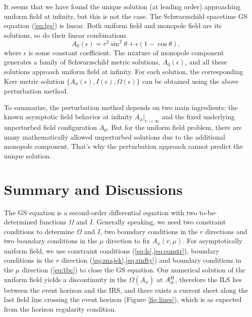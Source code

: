 \documentclass[iop,apj]{emulateapj}
\def\ct{\cos\theta}
\def\sst{\sin^2\theta}
\def\be{\begin{equation}}
\def\ee{\end{equation}}
\def\AB{A_\phi^{\rm H}}
\begin{document}
It seems that we have found the unique solution (at leading order) approaching uniform
field at infinity, but this is not the case.
The Schwarzschild spacetime GS equation (\ref{eq:lgs}) is linear.
Both uniform field and monopole field are its solutions, so do their linear combinations
\be
A_0(\epsilon) = r^2\sst + \epsilon (1-\ct),
\ee
where $\epsilon$ is some constant coefficient. The mixture of monopole component generates a
family of Schwarzschild metric solutions, $A_0(\epsilon)$, and all these solutions approach  uniform field at infinity.
For each solution, the corresponding Kerr metric solution $\{ A_\phi(\epsilon), I(\epsilon), \Omega(\epsilon) \}$
can be obtained using the above perturbation method.

To summarize, the perturbation method depends on two main ingredients:
the known asymptotic field behavior at infinity $A_\phi|_{r\rightarrow\infty}$
and the fixed underlying unperturbed field configuration $A_0$.
But for the uniform field problem,
there are many mathematically allowed unperturbed solutions
due to the additional monopole component.
That's why the perturbation approach cannot predict the unique solution.


\section{Summary and Discussions}
\label{sec:disc}
The GS equation is a second-order differential equation with two to-be-determined functions $\Omega$ and $I$.
Generally speaking, we need two constraint conditions to determine $\Omega$ and $I$,
two boundary conditions in the $r$ directions and two boundary conditions
in the $\mu$ direction to fix $A_\phi(r,\mu)$.
For asymptotically uniform field, we use constraint conditions (\ref{eq:ls},\ref{eq:constr}),
boundary conditions in the $r$ direction (\ref{eq:znajek},\ref{eq:rinfty})
and boundary conditions in the $\mu$ direction (\ref{eq:tbc}) to close the GS equation.
Our numerical solution of the uniform field yields a discontinuity in the $\Omega(A_\phi)$ at $\AB$,
therefore the ILS lies between the event horizon and the IRS, and there exists a current sheet along the last field
line crossing the event horizon (Figure \ref{fig:lines}), which is as expected from the horizon regularity condition.
\end{document}
